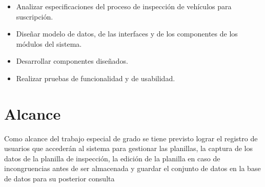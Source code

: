 \begin{itemize}

	
	





   \item Analizar especificaciones del proceso de inspección de vehículos para suscripción.

   \item Diseñar modelo de datos, de las interfaces y de los componentes de los módulos del sistema.

   \item Desarrollar componentes diseñados.

   \item Realizar pruebas de funcionalidad y de usabilidad.
	
	




	

\end{itemize}





\section{Alcance}

Como alcance del trabajo especial de grado se tiene previsto lograr el registro de usuarios que accederán al sistema para gestionar las planillas, la captura de los datos de la planilla de inspección, la edición de la planilla en caso de incongruencias antes de ser almacenada y guardar el conjunto de datos en la base de datos para su posterior consulta

